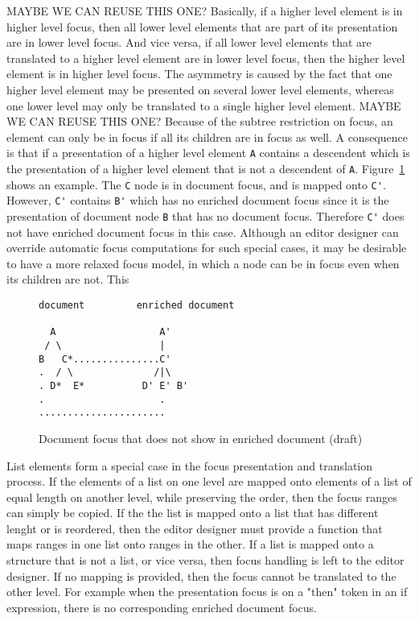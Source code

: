 \bc MAYBE WE CAN REUSE THIS ONE?
Basically, if a higher level element is in higher level focus, then all lower level elements that are part of its presentation are in lower level focus. And vice versa, if all lower level elements that are translated to a higher level element are in lower level focus, then the higher level element is in higher level focus. The asymmetry is caused by the fact that one higher level element may be presented on several lower level elements, whereas one lower level may only be translated to a single higher level element.
\ec
\bc MAYBE WE CAN REUSE THIS ONE?
Because of the subtree restriction on focus, an element can only be in focus if all its children are in focus as well.  A consequence is that if a presentation of a higher level element \verb|A| contains a descendent which is the presentation of a higher level element that is not a descendent of \verb|A|. Figure~\ref{unpresentableFocus} shows an example. The \verb|C| node is in document focus, and is mapped onto \verb|C'|. However, \verb|C'| contains \verb|B'| which has no enriched document focus since it is the presentation of document node \verb|B| that has no document focus. Therefore \verb|C'| does not have enriched document focus in this case. Although an editor designer can override automatic focus computations for such special cases, it may be desirable to have a more relaxed focus model, in which a node can be in focus even when its children are not. This 
\ec

\begin{figure}
\begin{small}
\begin{center}
\begin{verbatim}
document         enriched document

  A                  A'
 / \                 |
B   C*...............C'
.  / \              /|\
. D*  E*          D' E' B'
.                    .
......................    
\end{verbatim}
\caption{Document focus that does not show in enriched document (draft)}\label{unpresentableFocus} 
\end{center}
\end{small}
\end{figure}



List elements form a special case in the focus presentation and translation process. If the elements of a list on one level are mapped onto elements of a list of equal length on another level, while preserving the order, then the focus ranges can simply be copied. If the the list is mapped onto a list that has different lenght or is reordered, then the editor designer must provide a function that maps ranges in one list onto ranges in the other. If a list is mapped onto a structure that is not a list, or vice versa, then focus handling is left to the editor designer. If no mapping is provided, then the focus cannot be translated to the other level. For example when the presentation focus is on a "then" token in an if expression, there is no corresponding enriched document focus.

